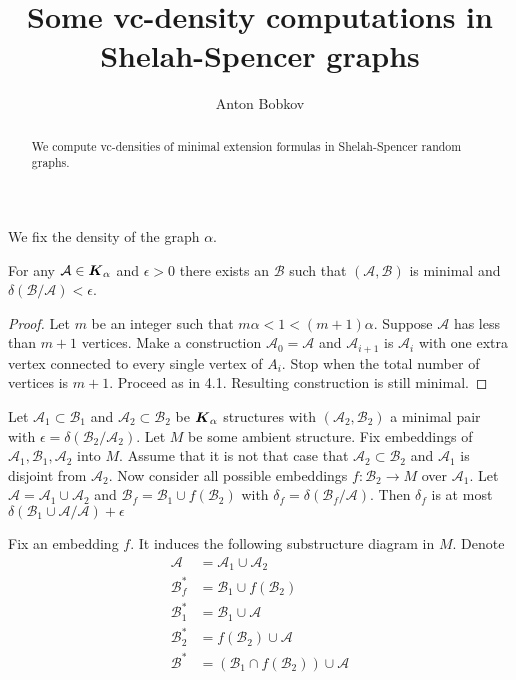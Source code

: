 \documentclass{amsart}
\newcommand{\A}{\mathcal A}
\newcommand{\B}{\mathcal B}
\newcommand{\K}{\boldface K_\alpha}
\begin{document}
\title{Some vc-density computations in Shelah-Spencer graphs}
\author{Anton Bobkov}

\begin{abstract}
	We compute vc-densities of minimal extension formulas in Shelah-Spencer random graphs.
\end{abstract}

\maketitle

We fix the density of the graph $\alpha$.

\begin{Lemma}
	For any $\A \in \K$ and $\epsilon > 0$ there exists an $\B$ such that $(\A, \B)$ is minimal and $\delta(\B/\A) < \epsilon$.
\end{Lemma}

\begin{proof}
	Let $m$ be an integer such that $m\alpha < 1 < (m+1)\alpha$. Suppose $\A$ has less than $m+1$ vertices. Make a construction $\A_0 = \A$ and $\A_{i+1}$ is $\A_i$ with one extra vertex connected to every single vertex of $A_i$. Stop when the total number of vertices is $m+1$. Proceed as in \cite{Laskowski} 4.1. Resulting construction is still minimal.
\end{proof}

\begin{Lemma}
	Let $\A_1 \subset \B_1$ and $\A_2 \subset \B_2$ be $\K$ structures with $(\A_2, \B_2)$ a minimal pair with $\epsilon = \delta (\B_2/\A_2)$. Let $M$ be some ambient structure. Fix embeddings of $\A_1, \B_1, \A_2$ into $M$. Assume that it is not that case that $\A_2 \subset \B_2$ and $\A_1$ is disjoint from $\A_2$. Now consider all possible embeddings $f \colon \B_2 \to M$ over $\A_1$.  Let $\A = \A_1 \cup \A_2$ and $\B_f = \B_1 \cup f(\B_2)$ with $\delta_f = \delta(\B_f/\A)$. Then $\delta_f$ is at most $\delta(\B_1 \cup \A/\A) + \epsilon$
\end{Lemma}

Fix an embedding $f$. It induces the following substructure diagram in $M$. Denote 
\begin{align*}
	\A &= \A_1 \cup \A_2 \\
	\B_f^* &= \B_1 \cup f(\B_2) \\
	\B_1^* &= \B_1 \cup \A \\
	\B_2^* &= f(\B_2) \cup \A \\
	\B^* &= (\B_1 \cap f(\B_2)) \cup \A
\end{align*}
\end{document}
